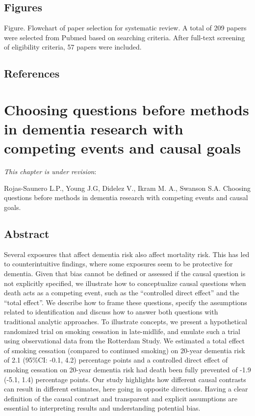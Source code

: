 \documentclass[
]{book}
\begin{document}
\hypertarget{figures}{%
\section{Figures}\label{figures}}

Figure. Flowchart of paper selection for systematic review. A total of 209 papers were selected from Pubmed based on searching criteria. After full-text screening of eligibility criteria, 57 papers were included.

\hypertarget{references-1}{%
\section{References}\label{references-1}}

\hypertarget{chapter6}{%
\chapter{Choosing questions before methods in dementia research with competing events and causal goals}\label{chapter6}}


\small

\noindent
\emph{This chapter is under revision}:

Rojas-Saunero L.P., Young J.G, Didelez V., Ikram M. A., Swanson S.A. Choosing questions before methods in dementia research with competing events and causal goals.

\newpage
\normalsize

\hypertarget{abstract-4}{%
\section{Abstract}\label{abstract-4}}

Several exposures that affect dementia risk also affect mortality risk. This has led to counterintuitive findings, where some exposures seem to be protective for dementia. Given that bias cannot be defined or assessed if the causal question is not explicitly specified, we illustrate how to conceptualize causal questions when death acts as a competing event, such as the ``controlled direct effect'' and the ``total effect''. We describe how to frame these questions, specify the assumptions related to identification and discuss how to answer both questions with traditional analytic approaches. To illustrate concepts, we present a hypothetical randomized trial on smoking cessation in late-midlife, and emulate such a trial using observational data from the Rotterdam Study. We estimated a total effect of smoking cessation (compared to continued smoking) on 20-year dementia risk of 2.1 (95\%CI: -0.1, 4.2) percentage points and a controlled direct effect of smoking cessation on 20-year dementia risk had death been fully prevented of -1.9 (-5.1, 1.4) percentage points. Our study highlights how different causal contrasts can result in different estimates, here going in opposite directions. Having a clear definition of the causal contrast and transparent and explicit assumptions are essential to interpreting results and understanding potential bias.
\end{document}
